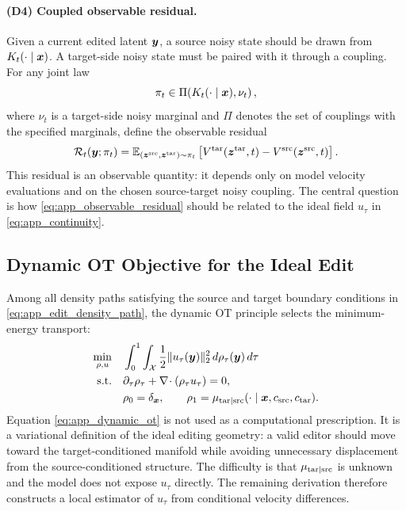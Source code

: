\paragraph{(D4) Coupled observable residual.}
Given a current edited latent $\boldsymbol{y}$, a source noisy state should be drawn from $K_t(\cdot\mid\boldsymbol{x})$.
A target-side noisy state must be paired with it through a coupling.
For any joint law
\begin{equation}
    \label{eq:app_general_coupling}
    \pi_t
    \in
    \Pi\!\left(
    K_t(\cdot\mid\boldsymbol{x}),
    \nu_t
    \right),
\end{equation}
where $\nu_t$ is a target-side noisy marginal and $\Pi$ denotes the set of couplings with the specified marginals, define the observable residual
\begin{equation}
    \label{eq:app_observable_residual}
    \mathcal{R}_t(\boldsymbol{y};\pi_t)
    =
    \mathbb{E}_{(\boldsymbol{z}^{\mathrm{src}},\boldsymbol{z}^{\mathrm{tar}})\sim\pi_t}
    \left[
    V^{\mathrm{tar}}(\boldsymbol{z}^{\mathrm{tar}},t)
    -
    V^{\mathrm{src}}(\boldsymbol{z}^{\mathrm{src}},t)
    \right].
\end{equation}
This residual is an observable quantity: it depends only on model velocity evaluations and on the chosen source-target noisy coupling.
The central question is how \eqref{eq:app_observable_residual} should be related to the ideal field $u_\tau$ in \eqref{eq:app_continuity}.

\subsection{Dynamic OT Objective for the Ideal Edit}

Among all density paths satisfying the source and target boundary conditions in \eqref{eq:app_edit_density_path}, the dynamic OT principle selects the minimum-energy transport:
\begin{equation}
    \label{eq:app_dynamic_ot}
    \begin{aligned}
    \min_{\rho,u}\quad
    &
    \int_0^1
    \int_{\mathcal{X}}
    \frac{1}{2}\|u_\tau(\boldsymbol{y})\|_2^2
    \,d\rho_\tau(\boldsymbol{y})\,d\tau
    \\
    \mathrm{s.t.}\quad
    &
    \partial_\tau\rho_\tau
    +
    \nabla\!\cdot(\rho_\tau u_\tau)=0,
    \\
    &
    \rho_0=\delta_{\boldsymbol{x}},
    \qquad
    \rho_1=\mu_{\mathrm{tar}|\mathrm{src}}(\cdot\mid \boldsymbol{x},c_{\mathrm{src}},c_{\mathrm{tar}}).
    \end{aligned}
\end{equation}
Equation \eqref{eq:app_dynamic_ot} is not used as a computational prescription.
It is a variational definition of the ideal editing geometry: a valid editor should move toward the target-conditioned manifold while avoiding unnecessary displacement from the source-conditioned structure.
The difficulty is that $\mu_{\mathrm{tar}|\mathrm{src}}$ is unknown and the model does not expose $u_\tau$ directly.
The remaining derivation therefore constructs a local estimator of $u_\tau$ from conditional velocity differences.

